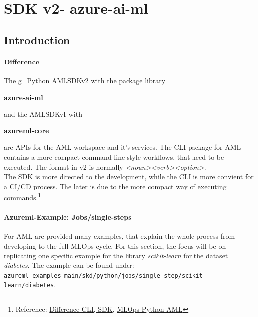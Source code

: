 \section{SDK v2- azure-ai-ml}
\subsection{Introduction}
\paragraph{Difference}
The \gls{g_Python} \gls{AMLSDKv2} with the package library
\begin{center}
	\textbf{azure-ai-ml}
\end{center}
and the \gls{AMLSDKv1} with 
\begin{center}
	\textbf{azureml-core}
\end{center}
are \gls{API}s for the \gls{AML} workspace and it's services. The \gls{CLI} package for \gls{AML} contains a more compact command line style workflows, that need to be executed. The format in v2 is normally \textit{<noun><verb><option>}.\\

The \gls{SDK} is more directed to the development, while the \gls{CLI} is more convient for a \gls{CI}/\gls{CD} process. The later is due to the more compact way of executing commands.\footnote{Reference: \href{https://learn.microsoft.com/en-us/answers/questions/1395777/what-is-the-difference-between-azure-ail-ml-and-az}{Difference CLI, SDK}, \href{https://github.com/microsoft/MLOps}{MLOps Python AML}
}

\paragraph{Azureml-Example: Jobs/single-steps}
For \gls{AML} are provided many examples, that explain the whole process from developing to the full \gls{MLOps} cycle.
For this section, the focus will be on replicating one specific example for the library \textit{scikit-learn} for the dataset \textit{diabetes}. The example can be found under:\\ 
\verb+azureml-examples-main/skd/python/jobs/single-step/scikit-learn/diabetes+.

